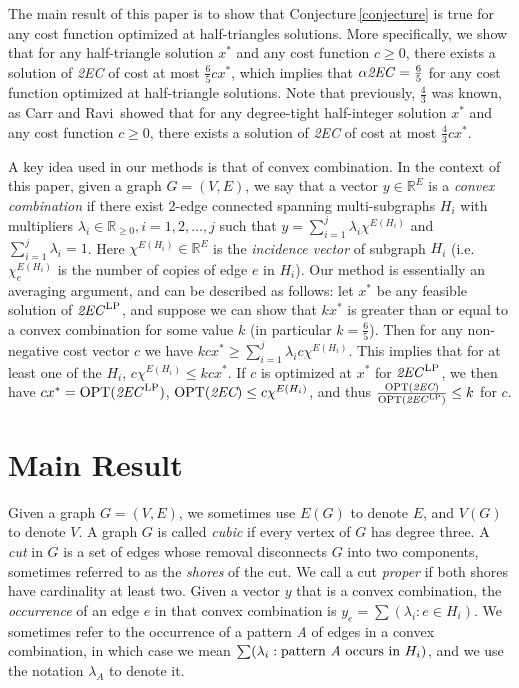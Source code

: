 \documentclass[oneeqnum,final]{siamltex1213}
\newcommand{\Real}{{\mathbb R}}
\newcommand{\TwoEC}{\emph{2EC}}
\newcommand{\TwoECLP}{\ensuremath{\text{\TwoEC}^{\text{LP}}}}
\newcommand{\alphaTwoEC}{\ensuremath{\alpha\text{\TwoEC}}}
\begin{document}
The main result of this paper is to show that Conjecture\,\ref{conjecture} is true for any cost function optimized at half-triangles solutions. More specifically, we show that for any half-triangle solution $x^{*}$ and any cost function $c\ge 0$, there exists a solution of \TwoEC{} of cost at most $\frac{6}{5}cx^{*}$, which implies that $\alphaTwoEC=\frac{6}{5}$ for any cost function optimized at half-triangle solutions. Note that previously, $\frac{4}{3}$ was known, as Carr and Ravi\,\cite{carr} showed that for any degree-tight half-integer solution $x^{*}$ and any cost function $c\geq 0$, there exists a solution of \TwoEC{} of cost at most $\frac{4}{3}cx^{*}$.

A key idea used in our methods is that of convex combination. In the context of this paper, given a graph $G=(V, E)$, we say that a vector $y\in\Real^{E}$ is a \emph{convex combination} if there exist 2-edge connected spanning multi-subgraphs $H_{i}$ with multipliers $\lambda_{i}\in\Real_{\geq 0}, i=1, 2, \dotsc, j$ such that $y=\sum_{i=1}^{j}\lambda_{i}\chi^{E(H_{i})}$ and $\sum_{i=1}^{j}\lambda_{i} = 1$. Here $\chi^{E(H_{i})}\in\Real^{E}$ is the \emph{incidence vector} of subgraph $H_{i}$ (i.e. $\chi^{E(H_{i})}_{e}$ is the number of copies of edge $e$ in $H_{i}$). Our method is essentially an averaging argument, and can be described as follows: let $x^{*}$ be any feasible solution of \TwoECLP, and suppose we can show that $kx^{*}$ is greater than or equal to a convex combination for some value $k$ (in particular $k=\frac{6}{5}$). Then for any non-negative cost vector $c$ we have $kcx^{*}\ge \sum_{i=1}^{j} \lambda_{i} c\chi^{E(H_{i})}$. This implies that for at least one of the $H_{i}$, $c\chi^{E(H_{i})}\le kcx^{*}$. If $c$ is optimized at $x^{*}$ for \TwoECLP, we then have $cx^{*}=\text{OPT}(\TwoECLP)$, $\text{OPT}(\TwoEC)\leq c\chi^{E(H_{i})}$, and thus $\frac{\text{OPT}(\TwoEC)}{\text{OPT}(\TwoECLP)}\le k$ for $c$.

\section{Main Result}

Given a graph $G=(V, E)$, we sometimes use $E(G)$ to denote $E$, and $V(G)$ to denote $V$. A graph $G$ is called \emph{cubic} if every vertex of $G$ has degree three. A \emph{cut} in $G$ is a set of edges whose removal disconnects $G$ into two components, sometimes referred to as the \emph{shores} of the cut. We call a cut \emph{proper} if both shores have cardinality at least two. Given a vector $y$ that is a convex combination, the \emph{occurrence} of an edge $e$ in that convex combination is $y_{e}=\sum(\lambda_{i}:e\in H_{i})$. We sometimes refer to the occurrence of a pattern \emph{A} of edges in a convex combination, in which case we mean $\sum(\lambda_{i}:\text{pattern \emph{A} occurs in } H_{i})$, and we use the notation $\lambda_{A}$ to denote it.
\end{document}
